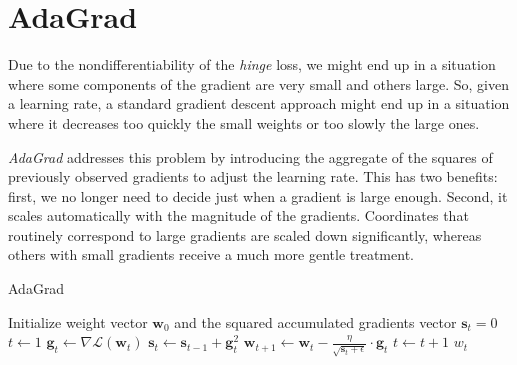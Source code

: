 \section{AdaGrad}

Due to the nondifferentiability of the \emph{hinge} loss, we might end up in a situation where some components of the gradient are very small and others large. So, given a learning rate, a standard gradient descent approach might end up in a situation where it decreases too quickly the small weights or too slowly the large ones.

\emph{AdaGrad} \cite{duchi2011adaptive} addresses this problem by introducing the aggregate of the squares of previously observed gradients to adjust the learning rate. This has two benefits: first, we no longer need to decide just when a gradient is large enough. Second, it scales automatically with the magnitude of the gradients. Coordinates that routinely correspond to large gradients are scaled down significantly, whereas others with small gradients receive a much more gentle treatment.

\begin{algorithm}[h!]
	\caption{AdaGrad}
	\label{alg:adagrad}
	\begin{algorithmic}[1]
			\State Initialize weight vector $\textbf{w}_0$ and the squared accumulated gradients vector $\textbf{s}_t = 0$
			\State $t \gets 1$
				\State $\textbf{g}_t \gets \nabla \mathcal{L}(\textbf{w}_t)$
				\State $\textbf{s}_t \gets \textbf{s}_{t-1} + \textbf{g}_t^2$
				\State $\textbf{w}_{t+1} \gets \textbf{w}_t - \displaystyle \frac{\eta}{\sqrt{\textbf{s}_t + \epsilon}} \cdot \textbf{g}_t$
				\State $t \gets t + 1$
			\EndWhile
			\State \Return $w_t$
		\EndFunction
	\end{algorithmic}
\end{algorithm}

